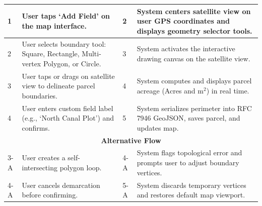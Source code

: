 \documentclass{FastFyp}
\begin{document}
\begin{table}[!ht]
\begin{tabular}{|lllll|}
\multicolumn{1}{|p{0.8cm}|}{1} &
  \multicolumn{2}{p{6.0cm}|}{User taps `Add Field' on the map interface.} &
  \multicolumn{1}{p{0.8cm}|}{2} &
  \multicolumn{1}{p{5.6cm}|}{System centers satellite view on user GPS coordinates and displays geometry selector tools.} \\ \hline
\multicolumn{1}{|p{0.8cm}|}{2} &
  \multicolumn{2}{p{6.0cm}|}{User selects boundary tool: Square, Rectangle, Multi-vertex Polygon, or Circle.} &
  \multicolumn{1}{p{0.8cm}|}{3} &
  \multicolumn{1}{p{5.6cm}|}{System activates the interactive drawing canvas on the satellite view.} \\ \hline
\multicolumn{1}{|p{0.8cm}|}{3} &
  \multicolumn{2}{p{6.0cm}|}{User taps or drags on satellite view to delineate parcel boundaries.} &
  \multicolumn{1}{p{0.8cm}|}{4} &
  \multicolumn{1}{p{5.6cm}|}{System computes and displays parcel acreage (Acres and $\text{m}^2$) in real time.} \\ \hline
\multicolumn{1}{|p{0.8cm}|}{4} &
  \multicolumn{2}{p{6.0cm}|}{User enters custom field label (e.g., `North Canal Plot') and confirms.} &
  \multicolumn{1}{p{0.8cm}|}{5} &
  \multicolumn{1}{p{5.6cm}|}{System serializes perimeter into RFC 7946 GeoJSON, saves parcel, and updates map.} \\ \hline
\multicolumn{5}{|c|}{\textbf{Alternative Flow}} \\ \hline
\multicolumn{1}{|p{0.8cm}|}{3-A} &
  \multicolumn{2}{p{6.0cm}|}{User creates a self-intersecting polygon loop.} &
  \multicolumn{1}{p{0.8cm}|}{4-A} &
  \multicolumn{1}{p{5.6cm}|}{System flags topological error and prompts user to adjust boundary vertices.} \\ \hline
\multicolumn{1}{|p{0.8cm}|}{4-A} &
  \multicolumn{2}{p{6.0cm}|}{User cancels demarcation before confirming.} &
  \multicolumn{1}{p{0.8cm}|}{5-A} &
  \multicolumn{1}{p{5.6cm}|}{System discards temporary vertices and restores default map viewport.} \\ \hline
\end{tabular}
\end{table}
\end{document}
